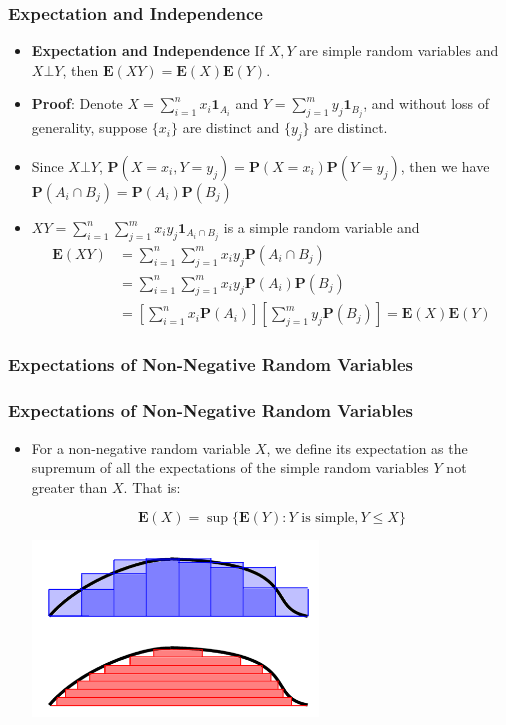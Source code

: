 \documentclass[handout]{beamer}
\newcommand{\BP}{\mathbf{P}}
\newcommand{\BE}{\mathbf{E}}
\newcommand{\BI}{\mathbf{1}}
\begin{document}
\frame
{
  \frametitle{Expectation and Independence}

   \begin{itemize}


\item<1-> \textbf{Expectation and Independence} If $X, Y$ are simple random variables and $X\bot Y$, then $\BE(XY)=\BE(X)\BE(Y)$.                         
\item<2-> \textbf{Proof}: Denote $X=\sum_{i=1}^n x_i \BI_{A_i}$ and $Y=\sum_{j=1}^m y_j \BI_{B_j}$, and without loss of generality, suppose $\{x_i\}$ are distinct and $\{y_j\}$ are distinct. 
                                                  
\item<3->[-] Since $X\bot Y$, $\BP(X=x_i, Y=y_j)=\BP(X=x_i)\BP(Y=y_j)$, then we have $\BP(A_i\cap B_j)=\BP(A_i)\BP(B_j)$
                                                                                                    
\item<4->[-] $XY=\sum_{i=1}^n \sum_{j=1}^m  x_iy_j \BI_{A_i \cap B_j}$ is a simple random variable and   
\begin{align*}
\BE(XY)&=\sum_{i=1}^n \sum_{j=1}^m  x_iy_j \BP(A_i \cap B_j) \\ 
&= \sum_{i=1}^n \sum_{j=1}^m  x_iy_j \BP(A_i)\BP(B_j) \\ 
&= \left[\sum_{i=1}^n  x_i \BP(A_i )\right] \left[ \sum_{j=1}^m  y_j \BP(B_j) \right]=\BE(X)\BE(Y)
\end{align*}
                                                                                                                           
\end{itemize}
}

\subsubsection{Expectations of Non-Negative Random Variables}


\frame
{
\frametitle{Expectations of Non-Negative Random Variables}

\begin{itemize}


\item<1-> For a non-negative random variable $X$, we define its expectation as the supremum of all the expectations of the simple random variables $Y$ not greater than $X$. That is:
                         
$$\BE(X)=\sup\{\BE(Y): Y\text{ is simple}, Y\leq X\}$$

\includegraphics[width=76mm]{RandLintegrals.png}

\end{itemize}
}
\end{document}
